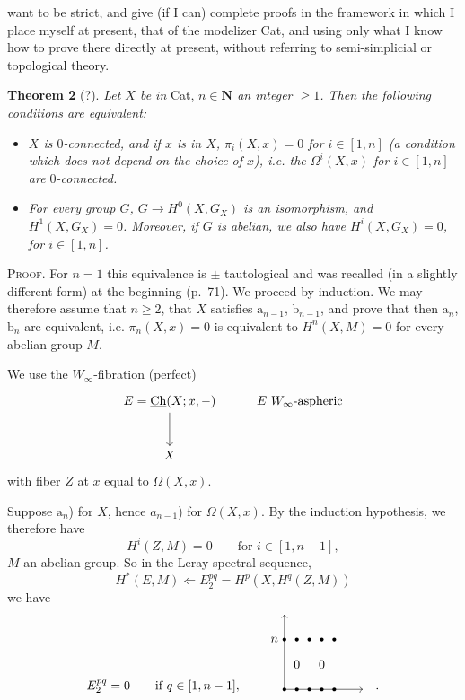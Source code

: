 \documentclass[11pt]{article}
\newcommand{\printedpage}[1]{\marginpar{\footnotesize p.~#1}}
\newcommand{\msp}[1]{\marginpar{\footnotesize [#1]}}
\newcommand{\Ch}{\underline{\mathrm{Ch}}}
\begin{document}
\printedpage{125}

\msp{page 188}
want to be strict, and give (if I can) complete proofs in the framework in which I place myself at present, that of the modelizer Cat, and using only what I know how to prove there directly at present, without referring to semi-simplicial or topological theory.

\textbf{Theorem 2} (?). \textit{Let $X$ be in} Cat, \textit{$n \in \mathbf{N}$ an integer $\geq 1$. Then the following conditions are equivalent:}

\begin{itemize}
\item[\textit{$a_n$)}] \textit{$X$ is $0$-connected, and if $x$ is in $X$, $\pi_i(X,x) = 0$ for $i \in [1,n]$ (a condition which does not depend on the choice of $x$), i.e. the $\Omega^i(X,x)$ for $i \in [1,n]$ are $0$-connected.}
\item[\textit{$b_n$)}] \textit{For every group $G$, $G \longrightarrow H^0(X,G_X)$ is an isomorphism, and $H^1(X,G_X) = 0$. Moreover, if $G$ is abelian, we also have $H^i(X,G_X) = 0$, for $i \in [1,n]$.}
\end{itemize}

\textsc{Proof}. For $n = 1$ this equivalence is $\pm$ tautological and was recalled (in a slightly different form) at the beginning (p.~71). We proceed by induction. We may therefore assume that $n \geq 2$, that $X$ satisfies $\mathrm{a}_{n-1}$, $\mathrm{b}_{n-1}$, and prove that then $\mathrm{a}_n$, $\mathrm{b}_n$ are equivalent, i.e. $\pi_n(X,x) = 0$ is equivalent to $H^n(X,M) = 0$ for every abelian group $M$.

\msp{page 189}
We use the $W_\infty$-fibration (perfect)
\[
\begin{tikzcd}[row sep=large]
E = \Ch(X;x,-) \arrow[d] & E\ W_\infty\text{-aspheric} \\
X &
\end{tikzcd}
\]
with fiber $Z$ at $x$ equal to $\Omega(X,x)$.

Suppose $\mathrm{a}_n$) for $X$, hence $a_{n-1}$) for $\Omega(X,x)$. By the induction hypothesis, we therefore have
\[
H^i(Z,M) = 0 \qquad \text{for } i \in [1,n-1],
\]
$M$ an abelian group. So in the Leray spectral sequence,
\[
H^*(E,M) \Longleftarrow E_2^{pq} = H^p(X,H^q(Z,M))
\]
we have
\[
E_2^{pq} = 0 \qquad \text{if } q \in [1,n-1], \qquad
\begin{tikzpicture}[baseline=0]
\draw[->] (0,0) -- (2.2,0);
\draw[->] (0,0) -- (0,2.1);
\foreach \x in {0,0.35,0.7,1.05,1.4} {
  \fill (\x,0) circle (1.5pt);
  \fill (\x,1.4) circle (1.5pt);
}
\node[left] at (-0.05,1.4) {$n$};
\node at (0.35,0.7) {$0$};
\node at (1.05,0.7) {$0$};
\end{tikzpicture}
\quad .
\]
\end{document}
